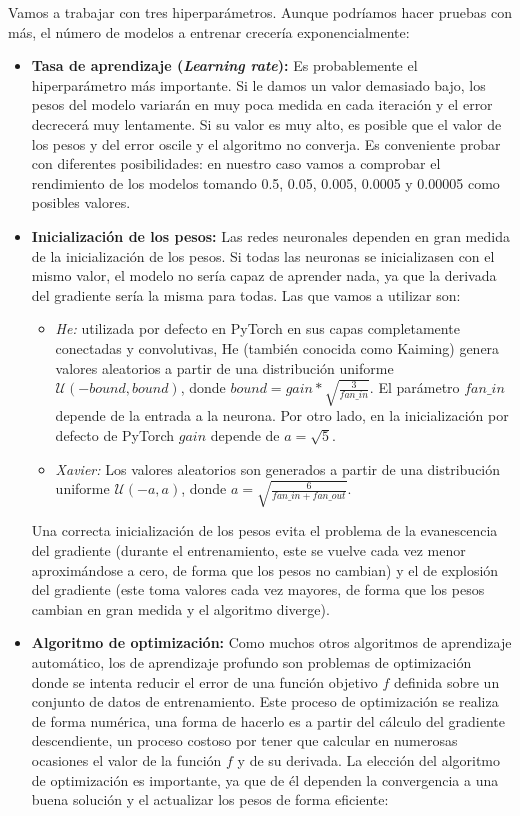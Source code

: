 Vamos a trabajar con tres hiperparámetros. Aunque podríamos hacer pruebas con más, el número de modelos a entrenar crecería exponencialmente:
\begin{itemize}
    \item \textbf{Tasa de aprendizaje (\textit{Learning rate}):} Es probablemente el hiperparámetro más importante. Si le damos un valor demasiado bajo, los pesos del modelo variarán en muy poca medida en cada iteración y el error decrecerá muy lentamente. Si su valor es muy alto, es posible que el valor de los pesos y del error oscile y el algoritmo no converja. Es conveniente probar con diferentes posibilidades: en nuestro caso vamos a comprobar el rendimiento de los modelos tomando 0.5, 0.05, 0.005, 0.0005 y 0.00005 como posibles valores. \cite{berzal2018redes}
    \item \textbf{Inicialización de los pesos:} Las redes neuronales dependen en gran medida de la inicialización de los pesos. Si todas las neuronas se inicializasen con el mismo valor, el modelo no sería capaz de aprender nada, ya que la derivada del gradiente sería la misma para todas. Las que vamos a utilizar son: \cite{pytorch-doc}
    \begin{itemize}
        \item \textit{He:} utilizada por defecto en PyTorch en sus capas completamente conectadas y convolutivas, He (también conocida como Kaiming) genera valores aleatorios a partir de una distribución uniforme $\mathcal{U}(-bound, bound)$, donde $bound = gain * \sqrt{\frac{3}{fan\_in}}$. El parámetro $fan\_in$ depende de la entrada a la neurona. Por otro lado, en la inicialización por defecto de PyTorch $gain$ depende de $a = \sqrt{5}$.
        \item \textit{Xavier:} Los valores aleatorios son generados a partir de una distribución uniforme $\mathcal{U}(-a, a)$, donde $a = \sqrt{\frac{6}{fan\_in + fan\_out}}$. 
    \end{itemize}
    Una correcta inicialización de los pesos evita el problema de la evanescencia del gradiente (durante el entrenamiento, este se vuelve cada vez menor aproximándose a cero, de forma que los pesos no cambian) y el de explosión del gradiente (este toma valores cada vez mayores, de forma que los pesos cambian en gran medida y el algoritmo diverge).
    \item \textbf{Algoritmo de optimización:} Como muchos otros algoritmos de aprendizaje automático, los de aprendizaje profundo son problemas de optimización donde se intenta reducir el error de una función objetivo $f$ definida sobre un conjunto de datos de entrenamiento. Este proceso de optimización se realiza de forma numérica, una forma de hacerlo es a partir del cálculo del gradiente descendiente, un proceso costoso por tener que calcular en numerosas ocasiones el valor de la función $f$ y de su derivada. La elección del algoritmo de optimización es importante, ya que de él dependen la convergencia a una buena solución y el actualizar los pesos de forma eficiente: \cite{berzal2018redes}

\end{itemize}
